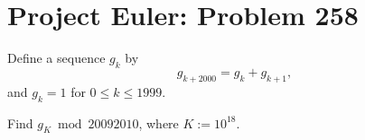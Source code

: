\documentclass[a4paper, 12pt]{article}
\begin{document}
\section*{Project Euler: Problem 258}

\begin{sidebox}
    \begin{problem}
        Define a sequence \( g_k \) by
        \[
            g_{k + 2000} = g_k + g_{k + 1}
        ,\]
        and \( g_k = 1 \) for \( 0 \le k \le 1999 \).

        \vspace{0.3cm}

        Find \( g_K \bmod 20092010 \), where \( K := 10^{18} \).
    \end{problem}
\end{sidebox}
\end{document}
